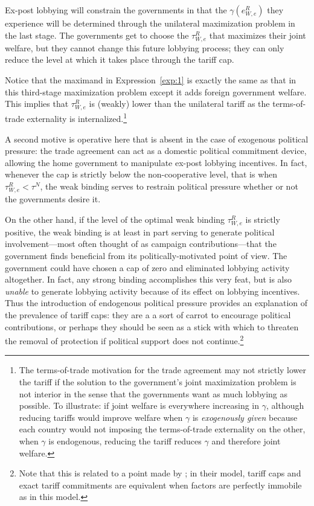 \documentclass[12pt]{article}
\newcommand{\ga}{\gamma}
\begin{document}
Ex-post lobbying will constrain the governments in that the $\ga\left(e^R_{W,e}\right)$ they experience will be determined through the unilateral maximization problem in the last stage. The governments get to choose the $\tau^R_{W,e}$ that maximizes their joint welfare, but they cannot change this future lobbying process; they can only reduce the level at which it takes place through the tariff cap.

Notice that the maximand in Expression~\ref{exp:1} is exactly the same as that in this third-stage maximization problem except it adds  foreign government welfare. This implies that $\tau^R_{W,e}$ is (weakly) lower than the unilateral tariff as the terms-of-trade externality is internalized.\footnote{The terms-of-trade motivation for the trade agreement may not strictly lower the tariff if the solution to the government's joint maximization problem is not interior in the sense that the governments want as much lobbying as possible. To illustrate: if joint welfare is everywhere increasing in $\ga$, although reducing tariffs would improve welfare when $\ga$ is \textit{exogenously given} because each country would not imposing the terms-of-trade externality on the other, when $\ga$ is endogenous, reducing the tariff reduces $\ga$ and therefore joint welfare.\label{fn:tot}}

A second motive is operative here that is absent in the case of exogenous political pressure: the trade agreement can act as a domestic political commitment device, allowing the home government to manipulate ex-post lobbying incentives. In fact, whenever the cap is strictly below the non-cooperative level, that is when $\tau^R_{W,e} < \tau^N$, the weak binding serves to restrain political pressure whether or not the governments desire it.

On the other hand, if the level of the optimal weak binding $\tau^R_{W,e}$ is strictly positive, the weak binding is at least in part serving to generate political involvement---most often thought of as campaign contributions---that the government finds beneficial from its politically-motivated point of view. The government could have chosen a cap of zero and eliminated lobbying activity altogether. In fact, any strong binding accomplishes this very feat, but is also \textit{unable} to generate lobbying activity because of its effect on lobbying incentives. Thus the introduction of endogenous political pressure provides an explanation of the prevalence of tariff caps: they are a a sort of carrot to encourage political contributions, or perhaps they should be seen as a stick with which to threaten the removal of protection if political support does not continue.\footnote{Note that this is related to a point made by \Textcite{mrc2007}; in their model, tariff caps and exact tariff commitments are equivalent when factors are perfectly immobile as in this model.\label{fn:mrc1}}
\end{document}
